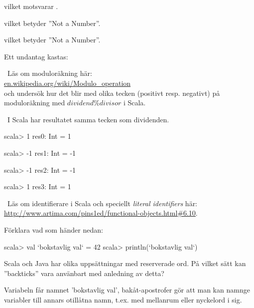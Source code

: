 \SubtaskSolved {} vilket motsvarar .

\SubtaskSolved {} vilket betyder ''Not a Number''.

\SubtaskSolved {} vilket betyder ''Not a Number''.

\SubtaskSolved Ett undantag kastas: 

\QUESTEND




\QUESTBEGIN

\Task\Uberkurs \what~Läs om moduloräkning här: \\
 \href{https://en.wikipedia.org/wiki/Modulo\_operation}{en.wikipedia.org/wiki/Modulo\_operation} \\
 och undersök hur det blir med olika tecken (positivt resp. negativt) på moduloräkning med $dividend \% divisor$ i Scala.


\SOLUTION

\TaskSolved \what~I Scala har resultatet samma tecken som dividenden.
\begin{REPL}
scala> 1 %
res0: Int = 1

scala> -1 %
res1: Int = -1

scala> -1 %
res2: Int = -1

scala> 1 %
res3: Int = 1

\end{REPL}

\QUESTEND





\QUESTBEGIN

\Task\Uberkurs \what~Läs om identifierare i Scala och speciellt \emph{literal identifiers} här: \url{http://www.artima.com/pins1ed/functional-objects.html#6.10}.

\Subtask Förklara vad som händer nedan:
\begin{REPLnonum}
scala> val `bokstavlig val` = 42
scala> println(`bokstavlig val`)
\end{REPLnonum}

\Subtask Scala och Java har olika uppsättningar med reserverade ord. På vilket sätt kan ''backticks'' vara använbart med anledning av detta?

\SOLUTION

\TaskSolved \what

\SubtaskSolved Variabeln får namnet 'bokstavlig val', bakåt-apostrofer  gör att man kan namnge variabler till annars otillåtna namn, t.ex. med mellanrum eller nyckelord i sig.

